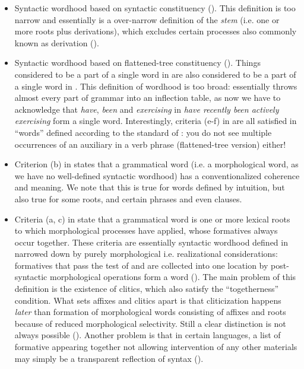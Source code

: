\documentclass[a4paper, oneside, scheme=plain, 12pt]{article}
\newcommand*{\citepage}[1]{p.~{#1}}
\newcommand*{\citepages}[1]{pp.~{#1}}
\newcommand*{\term}[1]{\emph{#1}}
\newcommand{\form}[1]{\emph{#1}}
\begin{document}
\begin{itemize}
    \item Syntactic wordhood based on syntactic constituency ().
    This definition is too narrow and essentially is a over-narrow definition of the \term{stem}
    (i.e. one or more roots plus derivations),
    which excludes certain processes also commonly known as derivation
    ().

    \item Syntactic wordhood based on flattened-tree constituency ().
    Things considered to be a part of a single word in 
    are also considered to be a part of a single word in .
    This definition of wordhood is too broad:
    essentially throws almost every part of grammar into an inflection table,
    as now we have to acknowledge that \form{have}, \form{been} and \form{exercising} in \form{have recently been actively exercising} form a single word.
    Interestingly, criteria (e-f) in \citet[\citepages{15-16}]{dixon2010basic2} are all satisfied in ``words'' defined according to the standard of :
    you do not see multiple occurrences of an auxiliary in a verb phrase (flattened-tree version) either!

    \item Criterion (b) in \citet[\citepage{13}]{dixon2010basic2} states that a grammatical word  (i.e. a morphological word, as we have no well-defined syntactic wordhood)
    has a conventionalized coherence and meaning.
    We note that this is true for words defined by intuition,
    but also true for some roots, and certain phrases and even clauses.

    \item Criteria (a, c) in \citet[\citepages{13-16}]{dixon2010basic2} state that 
    a grammatical word is one or more lexical roots to which morphological processes have applied,
    whose formatives always occur together.
    These criteria are essentially syntactic wordhood defined in 
    narrowed down by purely morphological i.e. realizational considerations:
    formatives that pass the test of  
    and are collected into one location by post-syntactic morphological operations
    form a word ().
    The main problem of this definition is the existence of clitics,
    which also satisfy the ``togetherness'' condition.
    What sets affixes and clitics apart is that cliticization happens \emph{later} than formation of morphological words consisting of affixes and roots
    because of reduced morphological selectivity.
    Still a clear distinction is not always possible ().
    Another problem is that in certain languages,
    a list of formative appearing together not allowing intervention of any other materials
    may simply be a transparent reflection of syntax ().
    

\end{itemize}
\end{document}
